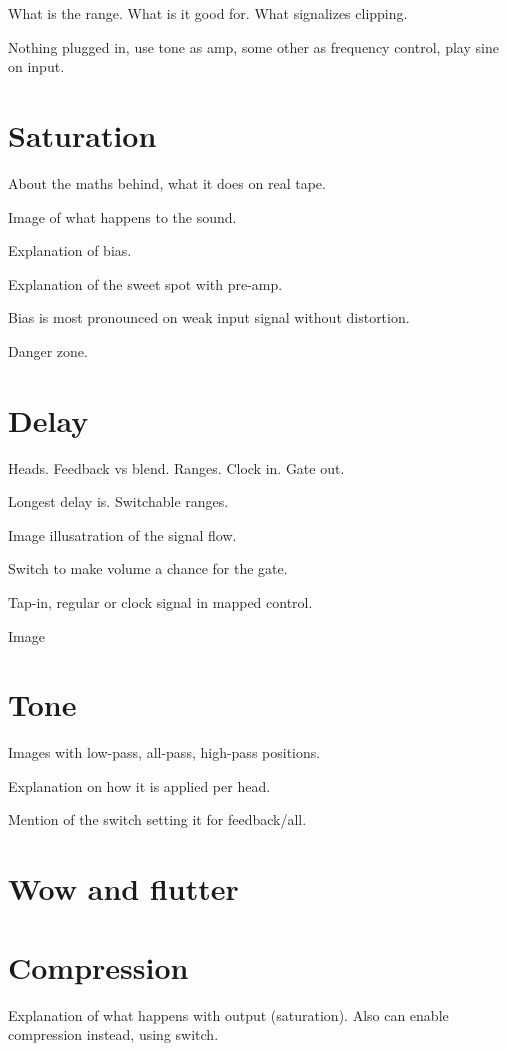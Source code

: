 \documentclass[11pt]{article}
\begin{document}
What is the range. What is it good for. What signalizes clipping.

Nothing plugged in, use tone as amp, some other as frequency control, play sine on input.

\section{Saturation}

About the maths behind, what it does on real tape.

Image of what happens to the sound.

Explanation of bias.

Explanation of the sweet spot with pre-amp.

Bias is most pronounced on weak input signal without distortion.

Danger zone.

\section{Delay}

Heads. Feedback vs blend. Ranges. Clock in. Gate out.

Longest delay is. Switchable ranges.

Image illusatration of the signal flow.

Switch to make volume a chance for the gate.

Tap-in, regular or clock signal in mapped control.

Image 

\section{Tone}

Images with low-pass, all-pass, high-pass positions.

Explanation on how it is applied per head.

Mention of the switch setting it for feedback/all.

\section{Wow and flutter}

\section{Compression}

Explanation of what happens with output (saturation). Also can enable compression instead, using switch.
\end{document}
